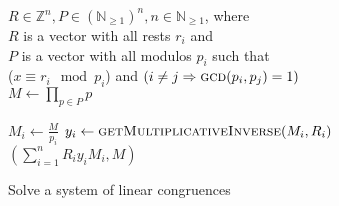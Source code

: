 \documentclass{article}
\begin{document}
\begin{preview}
    \begin{algorithm}[H]
        \begin{algorithmic}
            \Require $R \in \mathbb{Z}^n, P \in (\mathbb{N}_{\geq 1})^n, n \in \mathbb{N}_{\geq 1}$, where \\
					$R$ is a vector with all rests $r_i$ and\\
					$P$ is a vector with all modulos $p_i$ such that\\
					($x \equiv r_i \mod p_i$) and $\left(i \neq j \Rightarrow \Call{gcd}{p_i, p_j} = 1 \right)$
			\\
			\State $M \gets \prod_{p \in P} p$

				\State $M_i \gets \frac{M}{p_i} $
				\State $y_i \gets \Call{getMultiplicativeInverse}{M_i, R_i}$
			\EndFor
            \\
            \State \Return $(\sum_{i=1}^n R_i y_i M_i, M)$
        \end{algorithmic}
    \caption{Solve a system of linear congruences}
    \label{alg:solveCongruences}
    \end{algorithm}
\end{preview}
\end{document}
